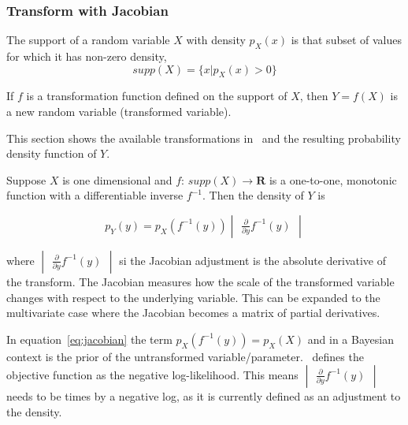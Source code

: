 \subsubsection{Transform with Jacobian}
The support of a random variable $X$ with density $p_X(x)$ is that subset of values for which it has non-zero density,
\begin{equation}
  supp(X) = \{x|p_X(x) > 0\}
\end{equation}

If $f$ is a transformation function defined on the support of $X$, then $Y = f(X)$ is a new random variable (transformed variable).

This section shows the available transformations in \CNAME\ and the resulting probability density function of $Y$. %

Suppose $X$ is one dimensional and $f$: $supp(X) \to \mathbf{R}$ is a one-to-one, monotonic function with a differentiable inverse $f^{-1}$. Then the density of $Y$ is

\begin{equation}\label{eq:jacobian}
	p_Y(y) = p_X(f^{-1}(y)) \begin{vmatrix} \frac{\partial}{\partial y} f^{-1}(y) \end{vmatrix}
\end{equation}

where $\begin{vmatrix} \frac{\partial}{\partial y} f^{-1}(y) \end{vmatrix}$ si the Jacobian adjustment is the absolute derivative of the transform. The Jacobian measures how the scale of the transformed variable changes with respect to the underlying variable. This can be expanded to the multivariate case where the Jacobian becomes a matrix of partial derivatives.

In equation~\ref{eq:jacobian} the term $p_X(f^{-1}(y)) = p_X(X)$ and in a Bayesian context is the prior of the untransformed variable/parameter. \CNAME\ defines the objective function as the negative log-likelihood. This means \(\begin{vmatrix} \frac{\partial}{\partial y} f^{-1}(y) \end{vmatrix}\) needs to be times by a negative log, as it is currently defined as an adjustment to the density.

